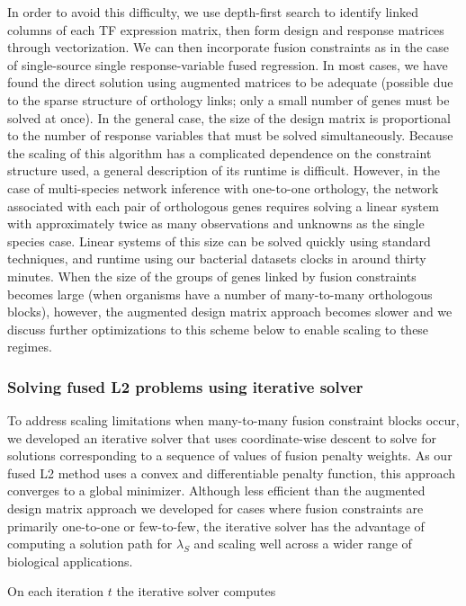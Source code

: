 \documentclass[11pt]{article}
\begin{document}
In order to avoid this difficulty, we use depth-first search to identify linked columns of each TF expression matrix, then form design and response matrices through vectorization. 
We can then incorporate fusion constraints as in the case of single-source single response-variable fused regression. 
In most cases, we have found the direct solution using augmented matrices to be adequate (possible due to the sparse structure of orthology links; only a small number of genes must be solved at once). 
In the general case, the size of the design matrix is proportional to the number of response variables that must be solved simultaneously. 
Because the scaling of this algorithm has a complicated dependence on the constraint structure used, a general description of its runtime is difficult. 
However, in the case of multi-species network inference with one-to-one orthology, the network associated with each pair of orthologous genes requires solving a linear system with approximately twice as many observations and unknowns as the single species case. 
Linear systems of this size can be solved quickly using standard techniques, and runtime using our bacterial datasets clocks in around thirty minutes. 
When the size of the groups of genes linked by fusion constraints becomes large (when organisms have a number of many-to-many orthologous blocks), however, the augmented design matrix approach becomes slower and we discuss further optimizations to this scheme below to enable scaling to these regimes.


\subsubsection{Solving fused L2 problems using iterative solver}

To address scaling limitations when many-to-many fusion constraint blocks occur, we developed an iterative solver that uses coordinate-wise descent to solve for solutions corresponding to a sequence of values of fusion penalty weights. 
As our fused L2 method uses a convex and differentiable penalty function, this approach converges to a global minimizer. 
Although less efficient than the augmented design matrix approach we developed for cases where fusion constraints are primarily one-to-one or few-to-few, the iterative solver has the advantage of computing a solution path for $\lambda_S$ and scaling well across a wider range of biological applications.

On each iteration $t$ the iterative solver computes
\end{document}
